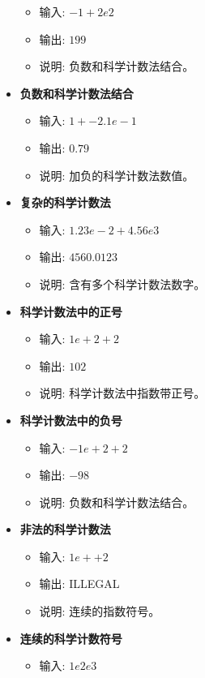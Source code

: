 \documentclass{article}
\begin{document}
\begin{itemize}
    \begin{itemize}
        \item 输入: \(-1 + 2e2\)
        \item 输出: \(199\)
        \item 说明: 负数和科学计数法结合。
    \end{itemize}
    \item \textbf{负数和科学计数法结合}
    \begin{itemize}
        \item 输入: \(1 + -2.1e-1\)
        \item 输出: \(0.79\)
        \item 说明: 加负的科学计数法数值。
    \end{itemize}
    \item \textbf{复杂的科学计数法}
    \begin{itemize}
        \item 输入: \(1.23e-2 + 4.56e3\)
        \item 输出: \(4560.0123\)
        \item 说明: 含有多个科学计数法数字。
    \end{itemize}
    \item \textbf{科学计数法中的正号}
    \begin{itemize}
        \item 输入: \(1e+2 + 2\)
        \item 输出: \(102\)
        \item 说明: 科学计数法中指数带正号。
    \end{itemize}
    \item \textbf{科学计数法中的负号}
    \begin{itemize}
        \item 输入: \(-1e+2 + 2\)
        \item 输出: \(-98\)
        \item 说明: 负数和科学计数法结合。
    \end{itemize}
    \item \textbf{非法的科学计数法}
    \begin{itemize}
        \item 输入: \(1e++2\)
        \item 输出: ILLEGAL
        \item 说明: 连续的指数符号。
    \end{itemize}
    \item \textbf{连续的科学计数符号}
    \begin{itemize}
        \item 输入: \(1e2e3\)

\end{itemize}
\end{itemize}
\end{document}
